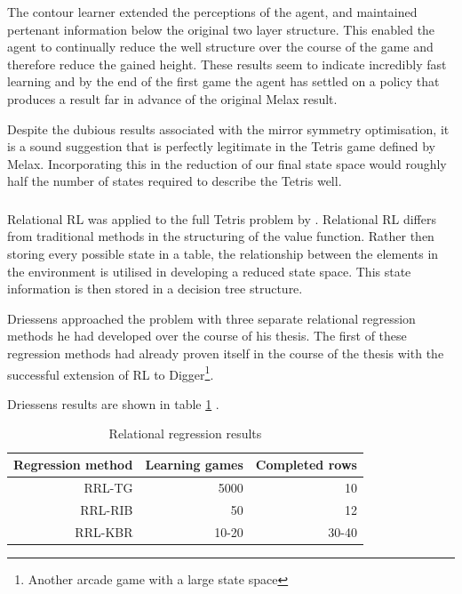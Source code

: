 \documentclass{rucsthesis}
\begin{document}
The contour learner extended the perceptions of the agent, and maintained pertenant information below the original two layer structure. This enabled the agent to continually reduce the well structure over the course of the game and therefore reduce the gained height. These results seem to indicate incredibly fast learning and by the end of the first game the agent has settled on a policy that produces a result far in advance of the original Melax result.

Despite the dubious results associated with the mirror symmetry optimisation, it is a sound suggestion that is perfectly legitimate in the Tetris game defined by Melax. Incorporating this in the reduction of our final state space would roughly half the number of states required to describe the Tetris well.

\subsubsection{\cite{kurt}}

Relational RL was applied to the full Tetris problem by \cite{kurt}. Relational RL differs from traditional methods in the structuring of the value function. Rather then storing every possible state in a table, the relationship between the elements in the environment is utilised in developing a reduced state space. This state information is then stored in a decision tree structure. 

Driessens approached the problem with three separate relational regression methods \citep{kurt} he had developed over the course of his thesis. The first of these regression methods had already proven itself in the course of the thesis with the successful extension of RL to Digger\footnote{Another arcade game with a large state space}. 

Driessens results are shown in table \ref{tbl:driessens} .

\begin{table}[h]
\centering
\begin{tabular}{|r|r|r|}
\hline
Regression method & Learning games & Completed rows  \\
\hline
RRL-TG	&	5000	& 	10   \\
\hline
RRL-RIB  &  50  & 12  \\
\hline
RRL-KBR  &  10-20  & 30-40  \\
\hline
\end{tabular}
\caption{Relational regression results \citep{kurt}}
\label{tbl:driessens}
\end{table}
\end{document}

